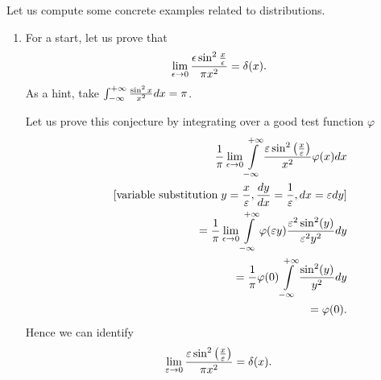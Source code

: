 {
\color{blue}
\bexample

Let us compute some concrete examples related to distributions.
\begin{enumerate}
\item
For a start, let us prove that
\begin{equation}
\lim_{\epsilon \rightarrow 0}{\epsilon \sin^2 \frac{x}{\epsilon}\over \pi
 x^2}= \delta (x).\end{equation}
As a hint, take  $\int_{-\infty}^{+\infty} {\sin^2x\over x^2}dx =\pi $.

Let us prove this conjecture by integrating over a good test function $\varphi$
\begin{equation}
\begin{split}
   {1\over\pi}\lim_{\epsilon \rightarrow 0}\int\limits_{-\infty}^{+\infty}
   {\varepsilon\sin^2\left({x\over\varepsilon}\right)\over x^2} \varphi(x) dx
\\
\qquad \textrm{[variable substitution}\;   y={x\over\varepsilon} , {dy\over dx}={1\over\varepsilon}, dx=\varepsilon dy
\textrm{]}
\\ \qquad =
  {1\over\pi}\lim_{\epsilon \rightarrow 0}
   \int\limits_{-\infty}^{+\infty}\varphi(\varepsilon y)
   {\varepsilon^2\sin^2(y)\over \varepsilon^2y^2}dy
\\ \qquad =    {1\over\pi}
   \varphi(0)\int\limits_{-\infty}^{+\infty}{\sin^2(y)\over y^2}dy
\\ \qquad =    \varphi(0).
\end{split}
\end{equation}
Hence we can identify
\begin{equation}
   \lim_{\varepsilon \rightarrow 0}{\varepsilon\sin^2 \left({x\over\varepsilon}\right)\over\pi x^2}=\delta(x).
\end{equation}


\end{enumerate}}
